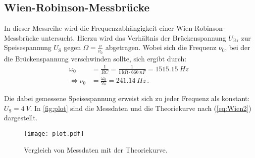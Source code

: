\subsection{Wien-Robinson-Messbrücke} \label{sec:wienausw}

In dieser Messreihe wird die Frequenzabhängigkeit einer Wien-Robinson-Messbrücke untersucht.
Hierzu wird das Verhältnis der Brückenspannung $U_\text{Br}$ zur Speisespannung $U_\text{S}$
gegen $\Omega = \frac{\nu}{\nu_0}$ abgetragen. Wobei sich die Frequenz $\nu_0$, 
bei der die Brückenspannung verschwinden sollte, sich ergibt durch:
\begin{align*}
  \omega_{0} &=\frac{1}{R C}=\frac{1}{\qty{1}{\kilo\ohm} \cdot \qty{660}{nF}}= \qty{1515.15}{Hz} \\
  \Leftrightarrow \nu_{0} &=\frac{\omega_{0}}{2 \pi} = \qty{241.14}{Hz} \, .
\end{align*}

Die dabei gemessene Speisespannung erweist sich zu jeder Frequenz als konstant: $U_\text{S} = \qty{4}{V}$.
In \autoref{fig:plot} sind die Messdaten und die Theoriekurve nach (\ref{eq:Wien2}) dargestellt.
\begin{figure}[H]
  \centering
  \texttt{[image: plot.pdf]}
  \caption{Vergleich von Messdaten mit der Theoriekurve.}
  \label{fig:plot}
\end{figure}